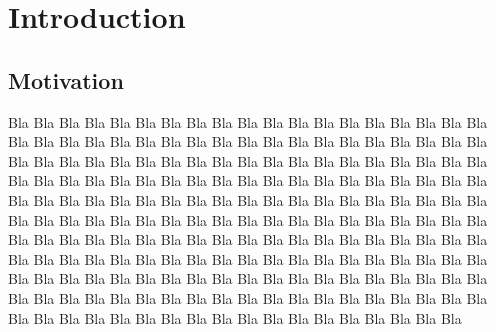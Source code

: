 %
%
%
%
%
%
%
%
%

\chapter{Introduction}

\section{Motivation}
\label{introduction:motivation}

Bla Bla Bla Bla Bla Bla Bla Bla Bla Bla Bla Bla Bla Bla Bla Bla Bla Bla Bla Bla
Bla Bla Bla Bla Bla Bla Bla Bla Bla Bla Bla Bla Bla Bla Bla Bla Bla Bla Bla Bla
Bla Bla Bla Bla Bla Bla Bla Bla Bla Bla Bla Bla Bla Bla Bla Bla Bla Bla Bla Bla
Bla Bla Bla Bla Bla Bla Bla Bla Bla Bla Bla Bla Bla Bla Bla Bla Bla Bla Bla Bla
Bla Bla Bla Bla Bla Bla Bla Bla Bla Bla Bla Bla Bla Bla Bla Bla Bla Bla Bla Bla
Bla Bla Bla Bla Bla Bla Bla Bla Bla Bla Bla Bla Bla Bla Bla Bla Bla Bla Bla Bla
Bla Bla Bla Bla Bla Bla Bla Bla Bla Bla Bla Bla Bla Bla Bla Bla Bla Bla Bla Bla
Bla Bla Bla Bla Bla Bla Bla Bla Bla Bla Bla Bla Bla Bla Bla Bla Bla Bla Bla Bla
Bla Bla Bla Bla Bla Bla Bla Bla Bla Bla Bla Bla Bla Bla Bla Bla Bla Bla Bla Bla
Bla Bla Bla Bla Bla Bla Bla Bla Bla Bla Bla Bla Bla Bla Bla Bla Bla Bla Bla Bla
Bla Bla Bla Bla Bla Bla Bla Bla

